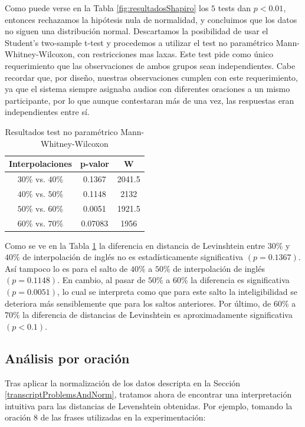 Como puede verse en la Tabla \ref{fig:resultadosShapiro} los $5$ tests dan $p<0.01$, entonces rechazamos la hipótesis nula de normalidad, y concluimos que los datos no siguen una distribución normal. Descartamos la posibilidad de usar el Student's two-sample t-test y procedemos a utilizar el test no paramétrico Mann-Whitney-Wilcoxon, con restricciones mas laxas. Este test pide como único requerimiento que las observaciones de ambos grupos sean independientes. Cabe recordar que, por diseño, nuestras observaciones cumplen con este requerimiento, ya que el sistema siempre asignaba audios con diferentes oraciones a un mismo participante, por lo que aunque contestaran más de una vez, las respuestas eran independientes entre sí.

\begin{table}
\centering
\begin{tabular}[t]{| c | c | c |}
\hline
Interpolaciones & p-valor & W \\
\hline
\hline
$30\%$ vs. $40\%$ & 0.1367 & 2041.5 \\
\hline
$40\%$ vs. $50\%$ & 0.1148 & 2132 \\
\hline
$50\%$ vs. $60\%$ & 0.0051 & 1921.5 \\
\hline
$60\%$ vs. $70\%$ & 0.07083 & 1956 \\
\hline
\end{tabular}
\caption{Resultados test no paramétrico Mann-Whitney-Wilcoxon} 
\label{tabla:Whitney}
\end{table}

Como se ve en la Tabla \ref{tabla:Whitney} la diferencia en distancia de Levinshtein entre $30\%$ y $40\%$ de interpolación de inglés no es estadísticamente significativa $(p=0.1367)$. Así tampoco lo es para el salto de $40\%$ a $50\%$ de interpolación de inglés $(p=0.1148)$. En cambio, al pasar de $50\%$ a $60\%$ la diferencia es significativa $(p=0.0051)$, lo cual se interpreta como que para este salto la inteligibilidad se deteriora más sensiblemente que para los saltos anteriores. Por último, de $60\%$ a $70\%$ la diferencia de distancias de Levinshtein es aproximadamente significativa $(p<0.1)$.

\subsection{Análisis por oración}\label{analisisPorOracion}
Tras aplicar la normalización de los datos descripta en la Sección \ref{transcriptProblemsAndNorm}, tratamos ahora de encontrar una interpretación intuitiva para las distancias de Levenshtein obtenidas. Por ejemplo, tomando la oración $8$ de las frases utilizadas en la experimentación:

